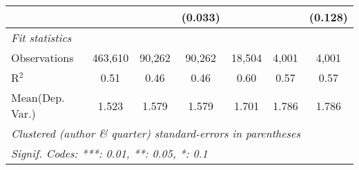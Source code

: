 \begin{tabular}{lcccccc}
                           &         &              & (0.033)       &              &         & (0.128)\\   
   \midrule
   \emph{Fit statistics}\\
   Observations            & 463,610 & 90,262       & 90,262        & 18,504       & 4,001   & 4,001\\  
   R$^2$                   & 0.51    & 0.46         & 0.46          & 0.60         & 0.57    & 0.57\\  
Mean(Dep. Var.) & 1.523 & 1.579 & 1.579 & 1.701 & 1.786 & 1.786 \\
   \midrule \midrule
   \multicolumn{7}{l}{\emph{Clustered (author \& quarter) standard-errors in parentheses}}\\
   \multicolumn{7}{l}{\emph{Signif. Codes: ***: 0.01, **: 0.05, *: 0.1}}\\
\end{tabular}
\par\endgroup
